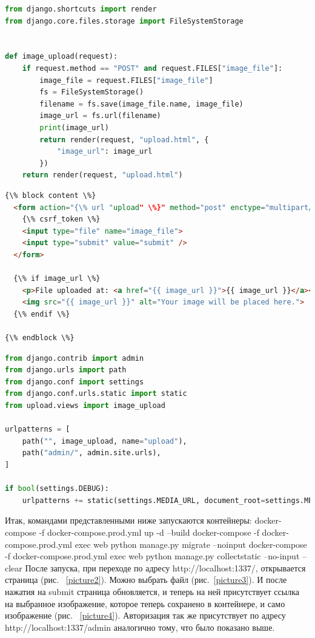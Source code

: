 \begin{lstlisting}[frame=single, label={views}, caption={\textsf{views.py}}, language=Python] 
from django.shortcuts import render
from django.core.files.storage import FileSystemStorage


def image_upload(request):
    if request.method == "POST" and request.FILES["image_file"]:
        image_file = request.FILES["image_file"]
        fs = FileSystemStorage()
        filename = fs.save(image_file.name, image_file)
        image_url = fs.url(filename)
        print(image_url)
        return render(request, "upload.html", {
            "image_url": image_url
        })
    return render(request, "upload.html")
\end{lstlisting}

\begin{lstlisting}[frame=single, label={upload}, caption={\textsf{upload.html}}, language=HTML] 
{\% block content \%}
  <form action="{\% url "upload" \%}" method="post" enctype="multipart/form-data">
    {\% csrf_token \%}
    <input type="file" name="image_file">
    <input type="submit" value="submit" />
  </form>

  {\% if image_url \%}
    <p>File uploaded at: <a href="{{ image_url }}">{{ image_url }}</a></p>
    <img src="{{ image_url }}" alt="Your image will be placed here.">
  {\% endif \%}

{\% endblock \%}
\end{lstlisting}

\begin{lstlisting}[frame=single, label={urls}, caption={\textsf{urls.py}}, language=Python] 
from django.contrib import admin
from django.urls import path
from django.conf import settings
from django.conf.urls.static import static
from upload.views import image_upload

urlpatterns = [
    path("", image_upload, name="upload"),
    path("admin/", admin.site.urls),
]

if bool(settings.DEBUG):
    urlpatterns += static(settings.MEDIA_URL, document_root=settings.MEDIA_ROOT)
\end{lstlisting}

	Итак, командами представленными ниже запускаются контейнеры:
\textsf{docker-compose -f docker-compose.prod.yml up -d --build}
\textsf{docker-compose -f docker-compose.prod.yml exec web python manage.py migrate --noinput}
\textsf{docker-compose -f docker-compose.prod.yml exec web python manage.py collectstatic --no-input –clear}
	После запуска, при переходе по адресу \textsf{http://localhost:1337/}, открывается страница (рис. ~\ref{picture2}). Можно выбрать файл (рис.~\ref{picture3}). И после нажатия на \textsf{submit} страница обновляется, и теперь на ней присутствует ссылка на выбранное изображение, которое теперь сохранено в контейнере, и само изображение (рис. ~\ref{picture4}). Авторизация так же присутствует по адресу \textsf{http://localhost:1337/admin} аналогично тому, что было показано выше.

